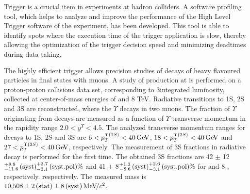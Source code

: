 Trigger is a crucial item in experiments at hadron colliders. 
A software profiling tool, which helps to analyze and improve the 
performance of the High Level Trigger software of the \lhcb experiment, has been developed. 
This tool is able to identify spots where the execution time of the trigger application is slow, 
thereby allowing the optimization of the trigger decision speed and minimizing deadtimes 
during data taking. 

The highly efficient \lhcb trigger allows precision studies 
of decays of heavy flavoured particles in final states with muons.  
A study of \chib production at \lhcb is performed on a proton-proton collisions data set, 
corresponding to 3\invfb integrated luminosity, collected
at center-of-mass energies of  and 8 TeV. Radiative \chib transitions to
\Y1S, \Y2S and \Y3S are reconstructed, where the $\Upsilon$ decays in two muons. 
The fraction of $\Upsilon$ originating from \chib decays
are measured as a function of $\Upsilon$ transverse momentum in the \lhcb rapidity range
$2.0 < y^{\Upsilon} < 4.5$. The analyzed transverse momentum ranges for decays
to \Y1S, \Y2S and \Y3S are $6<p_T^{\Y1S}<40\gev$, $18<p_T^{\Y2S}<40\gev$ and
$27<p_T^{\Y3S}<40\gev$, respectively. The measurement of
\Y3S fractions in radiative \chibThreeP decay is performed for the first time.
The obtained \Y3S fractions are 42 $\pm$ 12\stat${}^{+8.9}_{-11.6}\mathrm{\,(syst)}^{+2.7}_{-3.1}\mathrm{\,(syst.pol)} \%$ and 41 $\pm$ 8\stat${}^{+1.3}_{-8.6}\mathrm{\,(syst)}^{+2.6}_{-3.1}\mathrm{\,(syst.pol)} \%$ for  and 8 \tev, respectively. 
respectively. The measured \chiboneThreeP mass is $10{,}508 \pm 2\mathrm{\,(stat)} \pm
8\mathrm{\,(syst)} {\mathrm{\,Me\kern -0.1em V\!/}c^2}$.



